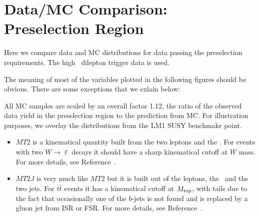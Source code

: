 \clearpage

\section{Data/MC Comparison: Preselection Region}
\label{sec:appendix_datamc}
Here we compare data and MC distributions for data passing the 
preselection requirements. The high \pt\ dilepton trigger
data is used.

The meaning of most of the variables plotted in 
the following figures should be obvious.  There
are some exceptions that we exlain below:

All MC samples are scaled by an overall factor 1.12,
the ratio of the observed data yield in the preselection region to the
prediction from MC.
For illustration purposes, we overlay the distributions from the LM1
SUSY benchmakr point.

\begin{itemize}

\item $MT2$ is a kinematical quantity 
built from the two leptons and the \met.  For events with
two $W \to \ell$ decays it should have a sharp kinematical cutoff
at $W$ mass.  For more details, see Reference~\cite{ref:MT2}.

\item $MT2J$ is very much like $MT2$ but it is built 
out of the leptons, the \met\ and the two jets.  For $t\bar{t}$
events it has a kinematical cutoff at $M_{\rm top}$, with tails
due to the fact that occasionally one of the $b$-jets is not
found and is replaced by a gluon jet from ISR or FSR.
For more details, see Reference~\cite{ref:MT2J}.


\end{itemize}


\clearpage

%
%

%

